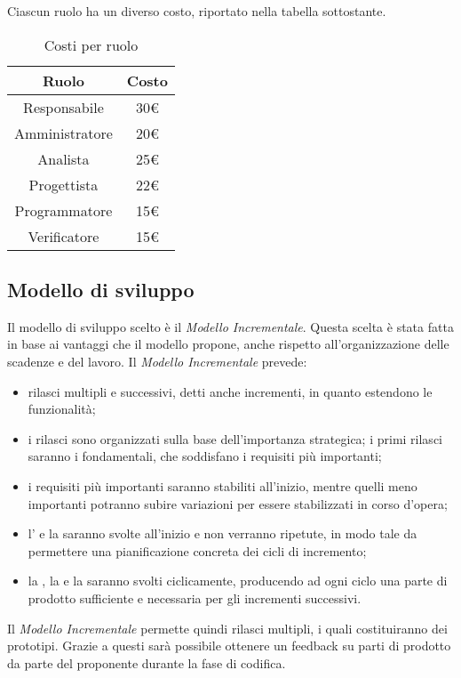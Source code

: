 Ciascun ruolo ha un diverso costo, riportato nella tabella sottostante.
\begin{table}[H]
	\centering
	\begin{tabular}{|c|c|}
		\hline
		\textbf{Ruolo} &
		\textbf{Costo}\\
		\hline
		Responsabile & 30€  \\
		\hline
		Amministratore &  20€ \\
		\hline
		Analista & 25€  \\
		\hline
		Progettista & 22€  \\
		\hline 
		Programmatore & 15€  \\
		\hline
		Verificatore &  15€ \\
		\hline
	\end{tabular}
	\caption{Costi per ruolo}
\end{table}

\subsection{Modello di sviluppo}
Il modello di sviluppo scelto è il \textit{Modello Incrementale}. Questa scelta è stata fatta in base ai vantaggi che il modello propone, anche rispetto all'organizzazione delle scadenze e del lavoro.
Il \textit{Modello Incrementale} prevede:
\begin{itemize}
	\item rilasci multipli e successivi, detti anche incrementi, in quanto estendono le funzionalità;
	\item i rilasci sono organizzati sulla base dell'importanza strategica; i primi rilasci saranno i fondamentali, che soddisfano i requisiti più importanti;
	\item i requisiti più importanti saranno stabiliti all'inizio, mentre quelli meno importanti potranno subire variazioni per essere stabilizzati in corso d'opera;
	\item l’\AR{} e la \PA{} saranno svolte all'inizio e non verranno ripetute, in modo tale da permettere una pianificazione concreta dei cicli di incremento;
	\item la \PD{}, la \Cod{} e la \VV{} saranno svolti ciclicamente, producendo ad ogni ciclo una parte di prodotto sufficiente e necessaria per gli incrementi successivi.
\end{itemize}
Il \textit{Modello Incrementale} permette quindi rilasci multipli, i quali costituiranno dei prototipi. Grazie a questi sarà possibile ottenere un feedback su parti di prodotto da parte del proponente durante la fase di codifica.


